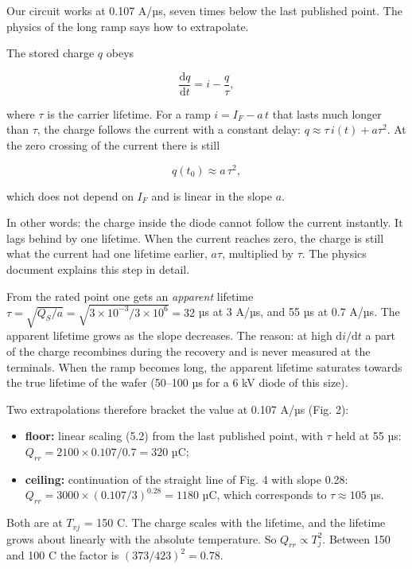 \documentclass[11pt,a4paper,numbers=noenddot]{scrartcl}
\providecommand{\tightlist}{\setlength{\itemsep}{0pt}\setlength{\parskip}{0pt}}
\begin{document}
\begin{onehalfspace}
Our circuit works at 0.107 A/µs, seven times below the last published point. The physics of the long ramp says how to extrapolate.

The stored charge \(q\) obeys

\[\frac{\mathrm{d}q}{\mathrm{d}t} = i - \frac{q}{\tau},\]

where \(\tau\) is the carrier lifetime. For a ramp \(i = I_F - a\,t\) that lasts much longer than \(\tau\), the charge follows the current with a constant delay: \(q \approx \tau\, i(t) + a\tau^2\). At the zero crossing of the current there is still

\[q(t_0) \approx a\,\tau^2, \tag{5.2}\]

which does not depend on \(I_F\) and is linear in the slope \(a\).

\begin{mybox}
In other words: the charge inside the diode cannot follow the current instantly. It lags behind by one lifetime. When the current reaches zero, the charge is still what the current had one lifetime earlier, \(a\tau\), multiplied by \(\tau\). The physics document explains this step in detail.
\end{mybox}

From the rated point one gets an \emph{apparent} lifetime \(\tau = \sqrt{Q_S/a} = \sqrt{3 \times 10^{-3} / 3 \times 10^{6}} = 32\) µs at 3 A/µs, and 55 µs at 0.7 A/µs. The apparent lifetime grows as the slope decreases. The reason: at high \(\mathrm{d}i/\mathrm{d}t\) a part of the charge recombines during the recovery and is never measured at the terminals. When the ramp becomes long, the apparent lifetime saturates towards the true lifetime of the wafer (50--100 µs for a 6 kV diode of this size).

Two extrapolations therefore bracket the value at 0.107 A/µs (Fig. 2):

\begin{itemize}
\tightlist
\item
  \textbf{floor:} linear scaling (5.2) from the last published point, with \(\tau\) held at 55 µs: \(Q_{rr} = 2100 \times 0.107/0.7 = 320\) µC;
\item
  \textbf{ceiling:} continuation of the straight line of Fig. 4 with slope 0.28: \(Q_{rr} = 3000 \times (0.107/3)^{0.28} = 1180\) µC, which corresponds to \(\tau \approx 105\) µs.
\end{itemize}

Both are at \(T_{vj}\) = 150 \textdegree{}C. The charge scales with the lifetime, and the lifetime grows about linearly with the absolute temperature. So \(Q_{rr} \propto T_j^2\). Between 150 and 100 \textdegree{}C the factor is \((373/423)^2 = 0.78\).


\end{onehalfspace}
\end{document}
